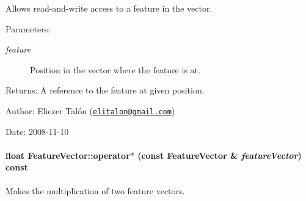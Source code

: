 Allows read-and-write access to a feature in the vector. 

\begin{Desc}
\item[Parameters:]
\begin{description}
\item[{\em feature}]Position in the vector where the feature is at.\end{description}
\end{Desc}
\begin{Desc}
\item[Returns:]A reference to the feature at given position.\end{Desc}
\begin{Desc}
\item[Author:]Eliezer Talón (\href{mailto:elitalon@gmail.com}{\tt elitalon@gmail.com}) \end{Desc}
\begin{Desc}
\item[Date:]2008-11-10 \end{Desc}
\hypertarget{class_feature_vector_a0d4b7f99e906409e1bf2335055e4cfd}{
\paragraph[{operator$\ast$}]{\setlength{\rightskip}{0pt plus 5cm}float FeatureVector::operator$\ast$ (const {\bf FeatureVector} \& {\em featureVector}) const}\hfill}
\label{class_feature_vector_a0d4b7f99e906409e1bf2335055e4cfd}


Makes the multiplication of two feature vectors. 

